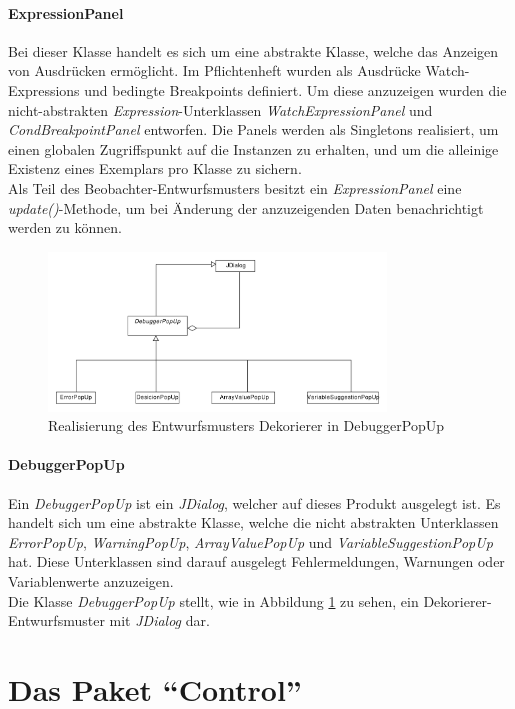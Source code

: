 \documentclass[parskip=full]{scrartcl}
\begin{document}
\paragraph{ExpressionPanel}
Bei dieser Klasse handelt es sich um eine abstrakte Klasse, welche das Anzeigen von Ausdrücken ermöglicht. Im Pflichtenheft wurden als Ausdrücke Watch-Expressions und bedingte Breakpoints definiert. Um diese anzuzeigen wurden die nicht-abstrakten \textit{Expression}-Unterklassen \textit{WatchExpressionPanel} und \textit{CondBreakpointPanel} entworfen. Die Panels werden als Singletons realisiert, um einen globalen Zugriffspunkt auf die Instanzen zu erhalten, und um die alleinige Existenz eines Exemplars pro Klasse zu sichern. \\
Als Teil des Beobachter-Entwurfsmusters besitzt ein \textit{ExpressionPanel} eine \textit{update()}-Methode, um bei Änderung der anzuzeigenden Daten benachrichtigt werden zu können.
\begin{figure}[!h]
\centering
\includegraphics[width=0.8\textwidth]{diagrammIdeenUmlet/GUIDekorierer.pdf}
\caption{Realisierung des Entwurfsmusters Dekorierer in DebuggerPopUp}
\label{guidekorierer}
\end{figure}
\paragraph{DebuggerPopUp}
Ein \textit{DebuggerPopUp} ist ein \textit{JDialog}, welcher auf dieses Produkt ausgelegt ist. Es handelt sich um eine abstrakte Klasse, welche die nicht abstrakten Unterklassen \textit{ErrorPopUp}, \textit{WarningPopUp}, \textit{ArrayValuePopUp} und \textit{VariableSuggestionPopUp} hat. Diese Unterklassen sind darauf ausgelegt Fehlermeldungen, Warnungen oder Variablenwerte anzuzeigen. \\ 
Die Klasse \textit{DebuggerPopUp} stellt, wie in Abbildung \ref{guidekorierer} zu sehen, ein Dekorierer-Entwurfsmuster mit \textit{JDialog} dar.

\section{Das Paket \enquote{Control}}
\label{Control}
\end{document}
